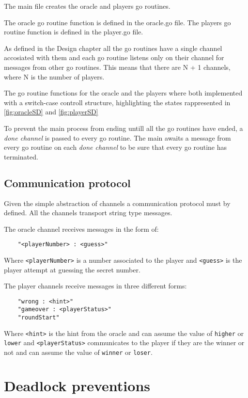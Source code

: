 \documentclass[12pt, a4paper]{report}
\begin{document}
The main file creates the oracle and players go routines.

The oracle go routine function is defined in the oracle.go file. The players go routine function is defined in the player.go file.

As defined in the Design chapter all the go routines have a single channel accosiated with them and each go routine listens only on their channel for messages from
 other go routines. This means that there are N + 1 channels, where N is the number of players.

The go routine functions for the oracle and the players where both implemented with a switch-case controll structure, highlighting the states
 rappresented in \ref{fig:oracleSD} and \ref{fig:playerSD}

To prevent the main process from ending untill all the go routines have ended, a \emph{done channel} is passed to every go routine. The main awaits a message
 from every go routine on each \emph{done channel} to be sure that every go routine has terminated.

\section{Communication protocol}
Given the simple abstraction of channels a communication protocol must by defined. All the channels transport string type messages.

The oracle channel receives messages in the form of:
\begin{lstlisting}
    "<playerNumber> : <guess>"
\end{lstlisting}
Where \verb|<playerNumber>| is a number associated to the player and \verb|<guess>| is the player attempt at guessing the secret number.

The player channels receive messages in three different forms:
\begin{lstlisting}
    "wrong : <hint>"
    "gameover : <playerStatus>"
    "roundStart"
\end{lstlisting}
Where \verb|<hint>| is the hint from the oracle and can assume the value of \verb|higher| or \verb|lower| 
 and \verb|<playerStatus>| communicates to the player if they are the winner or not and can assume the value of \verb|winner| or \verb|loser|.

\chapter{Deadlock preventions}
\end{document}

